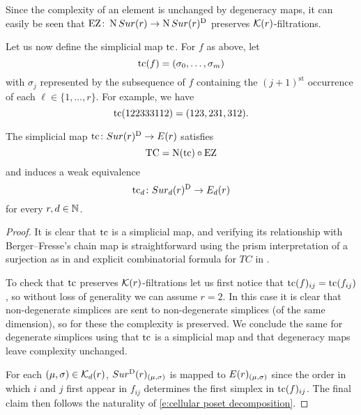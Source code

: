 Since the complexity of an element is unchanged by degeneracy maps, it can easily be seen that $\operatorname{EZ} \colon \operatorname{N}Sur(r) \to \operatorname{N}Sur(r)^{\mathrm{D}}$ preserves $\mathcal{K}(r)$-filtrations.

Let us now define the simplicial map $\operatorname{tc}$.
For $f$ as above, let
\[
\operatorname{tc}(f) = (\sigma_0,\dots,\sigma_m)
\]
with $\sigma_j$ represented by the subsequence of $f$ containing the $(j+1)^{\mathrm{st}}$ occurrence of each $\ell \in \{1,\dots,r\}$.
For example, we have
\[
\operatorname{tc}(122333112) = (123,231,312).
\]

\begin{theorem}
	The simplicial map $\operatorname{tc} \colon Sur(r)^{\mathrm{D}} \to E(r)$ satisfies
	\[
	\operatorname{TC} = \operatorname{N}(\operatorname{tc}) \circ \operatorname{EZ}
	\]
	and induces a weak equivalence
	\[
	\operatorname{tc}_d \colon Sur_d(r)^{\mathrm{D}} \to E_d(r)
	\]
	for every $r,d \in \mathbb{N}$.
\end{theorem}

\begin{proof}
	It is clear that $\operatorname{tc}$ is a simplicial map, and verifying its relationship with Berger--Fresse's chain map is straightforward using the prism interpretation of a surjection as in \cite[\S2.1]{berger2002prismatic} and explicit combinatorial formula for $TC$ in \cite[\S3.1]{berger2002prismatic}.

	To check that $\operatorname{tc}$ preserves $\mathcal{K}(r)$-filtrations let us first notice that $\operatorname{tc}(f)_{ij} = \operatorname{tc}(f_{ij})$, so without loss of generality we can assume $r=2$.
	In this case it is clear that non-degenerate simplices are sent to non-degenerate simplices (of the same dimension), so for these the complexity is preserved.
	We conclude the same for degenerate simplices using that $\operatorname{tc}$ is a simplicial map and that degeneracy maps leave complexity unchanged.

	For each $(\mu,\sigma) \in \mathcal{K}_d(r)$, $Sur^{\mathrm{D}}(r)_{(\mu,\sigma)}$ is mapped to $E(r)_{(\mu,\sigma)}$ since the order in which $i$ and $j$ first appear in $f_{ij}$ determines the first simplex in $\operatorname{tc}(f)_{ij}$.
	The final claim then follows the naturality of \eqref{e:cellular poset decomposition}.
\end{proof}